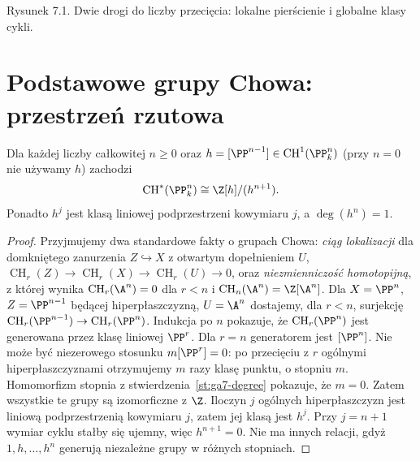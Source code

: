 \begin{center}
\begin{minipage}{\linewidth}
\centering
{}

{\small Rysunek 7.1. Dwie drogi do liczby przecięcia: lokalne pierścienie i globalne klasy cykli.}
\end{minipage}
\end{center}

\section{Podstawowe grupy Chowa: przestrzeń rzutowa}
\label{sec:ga7-projective-chow}

\begin{twierdzenie}
\label{tw:ga7-chow-pn}
Dla każdej liczby całkowitej $n\ge0$ oraz
$h=[\PP^{n-1}]\in\operatorname{CH}^1(\PP^n_k)$
(przy $n=0$ nie używamy $h$) zachodzi
\[
\operatorname{CH}^*(\PP^n_k)\cong\Z[h]/(h^{n+1}).
\]
Ponadto $h^j$ jest klasą liniowej podprzestrzeni
kowymiaru $j$, a $\deg(h^n)=1$.
\end{twierdzenie}
\begin{proof}
Przyjmujemy dwa standardowe fakty o grupach Chowa:
\emph{ciąg lokalizacji} dla domkniętego zanurzenia
$Z\hookrightarrow X$ z otwartym dopełnieniem $U$,
$\operatorname{CH}_r(Z)\to\operatorname{CH}_r(X)
\to\operatorname{CH}_r(U)\to0$, oraz
\emph{niezmienniczość homotopijną}, z której wynika
$\operatorname{CH}_r(\A^n)=0$ dla $r<n$ i
$\operatorname{CH}_n(\A^n)=\Z[\A^n]$.
Dla $X=\PP^n$, $Z=\PP^{n-1}$ będącej hiperpłaszczyzną,
$U=\A^n$ dostajemy, dla $r<n$, surjekcję
$\operatorname{CH}_r(\PP^{n-1})\to\operatorname{CH}_r(\PP^n)$.
Indukcja po $n$ pokazuje, że $\operatorname{CH}_r(\PP^n)$
jest generowana przez klasę liniowej $\PP^r$.
Dla $r=n$ generatorem jest $[\PP^n]$.
Nie może być niezerowego stosunku $m[\PP^r]=0$:
po przecięciu z $r$ ogólnymi hiperpłaszczyznami otrzymujemy
$m$ razy klasę punktu, o stopniu $m$.
Homomorfizm stopnia z
stwierdzenia~\ref{st:ga7-degree} pokazuje, że $m=0$.
Zatem wszystkie te grupy są izomorficzne z $\Z$.
Iloczyn $j$ ogólnych hiperpłaszczyzn jest liniową
podprzestrzenią kowymiaru $j$, zatem jej klasą jest $h^j$.
Przy $j=n+1$ wymiar cyklu stałby się ujemny, więc
$h^{n+1}=0$. Nie ma innych relacji, gdyż
$1,h,\ldots,h^n$ generują niezależne grupy
w różnych stopniach.
\end{proof}


